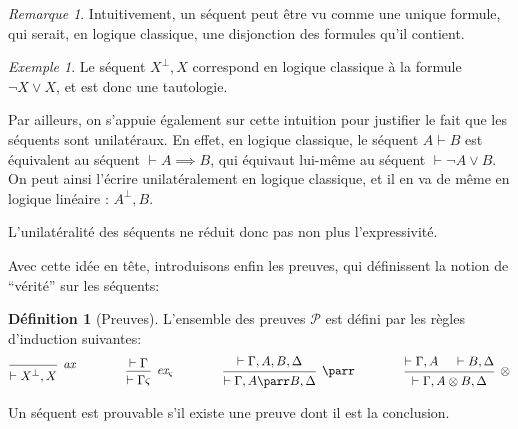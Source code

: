 \documentclass[11pt,a4paper]{article}
\theoremstyle{plain}
\theoremstyle{definition}
\newtheorem{definition}{Définition}
\theoremstyle{remark}
\newtheorem{remark}{Remarque}
\newtheorem{example}{Exemple}
\newcommand*{\orth}{^\perp}
\newcommand*{\tensor}{\otimes}
\newcommand*{\hypv}[1]{\hypo{\vdash #1}}
\newcommand*{\axv}[1]{\infer{0}[\ensuremath{\mathit{ax}}]{\vdash #1}}
\newcommand*{\tensorv}[1]{\infer{2}[\ensuremath{\tensor}]{\vdash #1}}
\newcommand*{\parrv}[1]{\infer{1}[\ensuremath{\parr}]{\vdash #1}}
\newcommand*{\permv}[2]{\infer{1}[\ensuremath{\textit{ex}_{#1}}]{\vdash #2}}
\newcommand*{\permapp}[2]{#2 #1}
\newcommand*{\someperm}{\varsigma}
\newcommand*{\sequent}{\Gamma}
\newcommand*{\sequentbis}{\Delta}
\newcommand*{\proofs}{\ensuremath{\mathcal{P}}}
\begin{document}
\begin{remark}
    Intuitivement, un séquent peut être vu comme une unique formule, qui serait, en logique classique, une disjonction des formules qu'il contient.

    \begin{example}
    \label{example_tautology}
    Le séquent $X\orth, X$ correspond en logique classique à la formule $\neg X \lor X$, et est donc une tautologie.
    \end{example}

    Par ailleurs, on s'appuie également sur cette intuition pour justifier le fait que les séquents sont unilatéraux. En effet, en logique classique, le séquent $A \vdash B$ est équivalent au séquent $\vdash A \implies B$, qui équivaut lui-même au séquent $\vdash \neg A \lor B$. On peut ainsi l'écrire unilatéralement en logique classique, et il en va de même en logique linéaire : $A\orth, B$.
    
    L'unilatéralité des séquents ne réduit donc pas non plus l'expressivité.
\end{remark}

Avec cette idée en tête, introduisons enfin les preuves, qui définissent la notion de ``vérité'' sur les séquents:

\begin{definition}[Preuves]
\label{proofs_def}
L'ensemble des preuves \proofs{} est défini par les règles d'induction suivantes:
\begin{equation*}
\begin{prooftree}
  \axv{X\orth, X}
\end{prooftree}
\qquad\qquad
\begin{prooftree}
  \hypv{\sequent}
  \permv{\someperm}{\permapp{\someperm}{\sequent}}
\end{prooftree}
\qquad\qquad
\begin{prooftree}
  \hypv{\sequent, A, B, \sequentbis}
  \parrv{\sequent, A \parr B, \sequentbis}
\end{prooftree}
\qquad\qquad
\begin{prooftree}
  \hypv{\sequent, A}
  \hypv{B, \sequentbis}
  \tensorv{\sequent, A \tensor B, \sequentbis}
\end{prooftree}
\end{equation*}

Un séquent est prouvable s'il existe une preuve dont il est la conclusion.
\end{definition}
\end{document}
